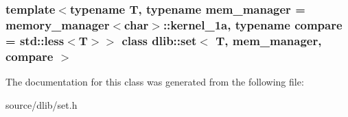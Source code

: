 \subsubsection*{template$<$typename T, typename mem\_\-manager = memory\_\-manager$<$char$>$::kernel\_\-1a, typename compare = std::less$<$T$>$$>$ class dlib::set$<$ T, mem\_\-manager, compare $>$}



The documentation for this class was generated from the following file:\begin{DoxyCompactItemize}
\item 
source/dlib/set.h\end{DoxyCompactItemize}
